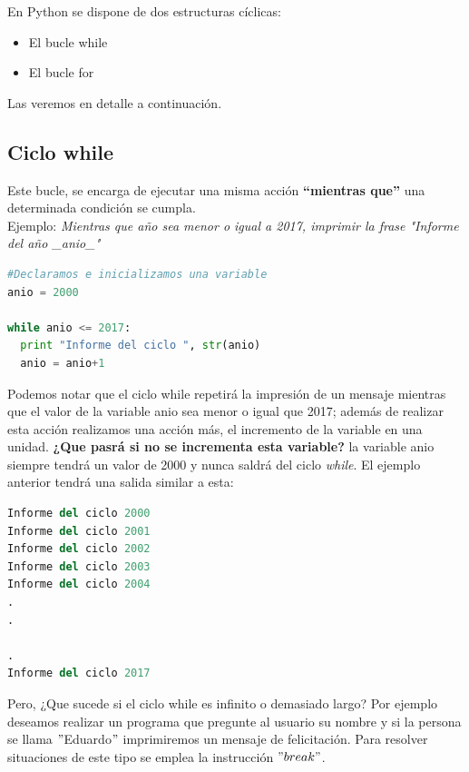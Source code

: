 \documentclass[a4paper, openright, 12pt]{article}
\begin{document}
    En Python se dispone de dos estructuras cíclicas:

    \begin{itemize}
      \item{El bucle while}
      \item{El bucle for}
    \end{itemize}

    Las veremos en detalle a continuación.\\

    \subsection{Ciclo while}
      Este bucle, se encarga de ejecutar una misma acción \textbf{“mientras que”} una determinada condición se cumpla.\\

      Ejemplo: \textit{Mientras que año sea menor o igual a 2017, imprimir la frase "Informe del año \_anio\_"}\\

\begin{lstlisting}[language=Python]
#Declaramos e inicializamos una variable
anio = 2000

while anio <= 2017:
  print "Informe del ciclo ", str(anio)
  anio = anio+1
\end{lstlisting}

    Podemos notar que el ciclo while repetirá la impresión de un mensaje mientras que el valor de la variable anio sea menor o igual que 2017; además de realizar esta acción realizamos una acción más, el incremento de la variable en una unidad. \textbf{¿Que pasrá si no se incrementa esta variable?} la variable anio siempre tendrá un valor de 2000 y nunca saldrá del ciclo \textit{while}. El ejemplo anterior tendrá una salida similar a esta:\\

\begin{lstlisting}[language=Python]
Informe del ciclo 2000
Informe del ciclo 2001
Informe del ciclo 2002
Informe del ciclo 2003
Informe del ciclo 2004
.
.

.
Informe del ciclo 2017
\end{lstlisting}

    Pero, ¿Que sucede si el ciclo while es infinito o demasiado largo? Por ejemplo deseamos realizar un programa que pregunte al usuario su nombre y si la persona se llama $"$Eduardo$"$ imprimiremos un mensaje de felicitación. Para resolver situaciones de este tipo se emplea la instrucción $"break"$.\\
\end{document}
